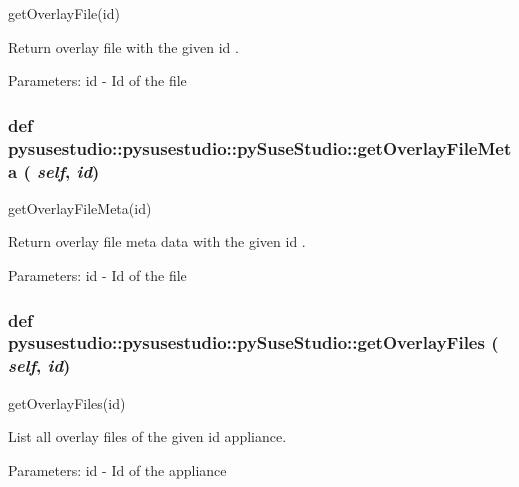 \label{classpysusestudio_1_1pysusestudio_1_1py_suse_studio_a9deb82a64dfb19c8c8733ae530a9b053}
\begin{DoxyVerb}getOverlayFile(id)

        Return overlay file with the given id .
        
            Parameters:
id - Id of the file

\end{DoxyVerb}
 \hypertarget{classpysusestudio_1_1pysusestudio_1_1py_suse_studio_abf5ad62bd9e7a35397502c640eebe5f8}{
\subsubsection[{getOverlayFileMeta}]{\setlength{\rightskip}{0pt plus 5cm}def pysusestudio::pysusestudio::pySuseStudio::getOverlayFileMeta ( {\em self}, \/   {\em id})}}
\label{classpysusestudio_1_1pysusestudio_1_1py_suse_studio_abf5ad62bd9e7a35397502c640eebe5f8}
\begin{DoxyVerb}getOverlayFileMeta(id)

        Return overlay file meta data with the given id .
        
            Parameters:
id - Id of the file

\end{DoxyVerb}
 \hypertarget{classpysusestudio_1_1pysusestudio_1_1py_suse_studio_a57a70ff3351bcaec6edaf52a6b67809e}{
\subsubsection[{getOverlayFiles}]{\setlength{\rightskip}{0pt plus 5cm}def pysusestudio::pysusestudio::pySuseStudio::getOverlayFiles ( {\em self}, \/   {\em id})}}
\label{classpysusestudio_1_1pysusestudio_1_1py_suse_studio_a57a70ff3351bcaec6edaf52a6b67809e}
\begin{DoxyVerb}getOverlayFiles(id)

        List all overlay files of the given id appliance.
        
            Parameters:
id - Id of the appliance

\end{DoxyVerb}
